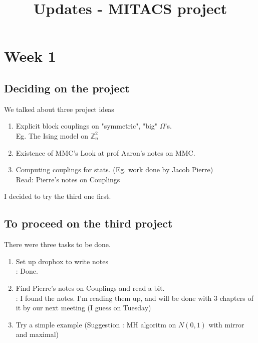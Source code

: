 \documentclass{article}
\title{Updates - MITACS project
}
\begin{document}
\maketitle
	\section{Week 1}
		\subsection{Deciding on the project}
			We talked about three project ideas
			\begin{enumerate}
				\item Explicit block couplings on "symmetric", "big" $\Omega$'s.\\
					Eg. The Ising model on $\mathbb{Z}^2_n$
				\item Existence of MMC's
					Look at prof Aaron's notes on MMC.
				\item Computing couplings for stats. (Eg. work done by Jacob Pierre)\\
					Read: Pierre's notes on Couplings
			\end{enumerate}
			I decided to try the third one first.

		\subsection{To proceed on the third project}
			There were three tasks to be done.
			\begin{enumerate}
				\item Set up dropbox to write notes\\
					\Update: Done.
				\item Find Pierre's notes on Couplings and read a bit.\\
					\Update: I found the notes. I'm reading them up, and will be done with 3 chapters of it by our next meeting (I guess on Tuesday)
				\item Try a simple example (Suggestion : MH algoritm on $N(0, 1)$ with mirror and maximal)\\

			\end{enumerate}
\end{document}
